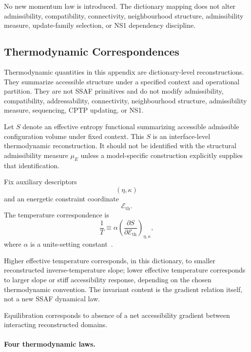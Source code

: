 \documentclass[aps,prx,onecolumn,11pt]{revtex4-2}
\theoremstyle{plain}
\theoremstyle{definition}
\theoremstyle{remark}
\begin{document}
No new momentum law is introduced. The dictionary mapping does not alter
admissibility, compatibility, connectivity, neighbourhood structure,
admissibility measure, update-family selection, or NS1 dependency
discipline.

\subsection{Thermodynamic Correspondences}
\label{appB:thermodynamic_correspondences}

Thermodynamic quantities in this appendix are dictionary-level
reconstructions. They summarize accessible structure under a specified
context and operational partition. They are not SSAF primitives and do
not modify admissibility, compatibility, addressability, connectivity,
neighbourhood structure, admissibility measure, sequencing, CPTP
updating, or NS1.

Let \(S\) denote an effective entropy functional summarizing accessible
admissible configuration volume under fixed context. This \(S\) is an
interface-level thermodynamic reconstruction. It should not be
identified with the structural admissibility measure \(\mu_E\) unless a
model-specific construction explicitly supplies that identification.

Fix auxiliary descriptors
\[
(\eta,\kappa)
\]
and an energetic constraint coordinate
\[
\mathcal{E}_{\mathrm{th}}.
\]
The temperature correspondence is
\begin{equation}
\frac{1}{T}
\equiv
\alpha
\left(
\frac{\partial S}{\partial \mathcal{E}_{\mathrm{th}}}
\right)_{\eta,\kappa},
\label{eq:temperature_correspondence}
\end{equation}
where \(\alpha\) is a units-setting constant~\cite{Callen1985,Reif1965}.

Higher effective temperature corresponds, in this dictionary, to smaller
reconstructed inverse-temperature slope; lower effective temperature
corresponds to larger slope or stiff accessibility response, depending
on the chosen thermodynamic convention. The invariant content is the
gradient relation itself, not a new SSAF dynamical law.

Equilibration corresponds to absence of a net accessibility gradient
between interacting reconstructed domains.

\paragraph{Four thermodynamic laws.}
\end{document}
